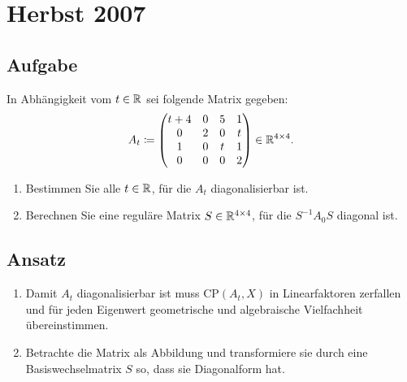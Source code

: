 \newpage

\section{Herbst 2007}

\subsection{Aufgabe}
In Abhängigkeit vom \( t \in \mathbb{R} \) sei folgende Matrix gegeben:
\begin{equation*}
	A_t \coloneqq \begin{pmatrix}
		t+4 & 0 & 5 & 1 \\
		0 & 2 & 0 & t \\
		1 & 0 & t & 1 \\
		0 & 0 & 0 & 2
	\end{pmatrix} \in \mathbb{R}^{4 \times 4}\text{.}
\end{equation*}
\begin{enumerate}
	\item Bestimmen Sie alle \( t \in \mathbb{R} \), für die \( A_t \) diagonalisierbar ist.
	\item Berechnen Sie eine reguläre Matrix \( S \in \mathbb{R}^{4 \times 4} \), für die \( S^{-1}A_0S \) diagonal ist. 
\end{enumerate}

\subsection{Ansatz}
\begin{enumerate}
	\item Damit \( A_t \) diagonalisierbar ist muss \( \text{CP}(A_t, X) \) in Linearfaktoren zerfallen und für jeden Eigenwert geometrische und algebraische Vielfachheit übereinstimmen.
	\item Betrachte die Matrix als Abbildung und transformiere sie durch eine Basiswechselmatrix \( S \) so, dass sie Diagonalform hat.
\end{enumerate}

